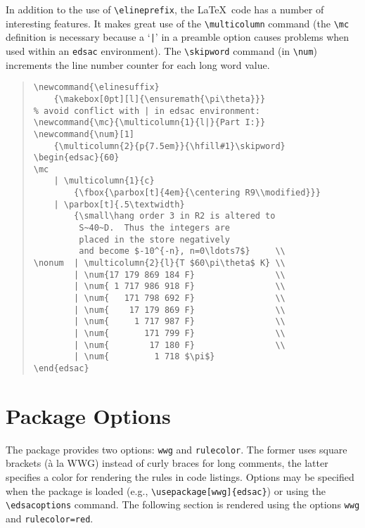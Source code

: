 \documentclass[11pt]{article}
\newcommand{\hang}{\leftskip=1em\parindent=-1em}
\begin{document}
In addition to the use of \verb"\elineprefix", the \LaTeX\ code has
a number of interesting features.  It makes great use of the
\verb"\multicolumn" command (the \verb"\mc" definition is necessary because
a `\verb"|"' in a preamble option causes problems when used within
an \texttt{edsac} environment).  The \verb"\skipword" command (in
\verb"\num")
increments the line number counter for each long word value.
\begin{quote}\small
\begin{verbatim}
\newcommand{\elinesuffix}
    {\makebox[0pt][l]{\ensuremath{\pi\theta}}}
% avoid conflict with | in edsac environment:
\newcommand{\mc}{\multicolumn{1}{l|}{Part I:}}
\newcommand{\num}[1]
    {\multicolumn{2}{p{7.5em}}{\hfill#1}\skipword}
\begin{edsac}{60}
\mc
    | \multicolumn{1}{c}
        {\fbox{\parbox[t]{4em}{\centering R9\\modified}}}
    | \parbox[t]{.5\textwidth}
        {\small\hang order 3 in R2 is altered to
         S~40~D.  Thus the integers are
         placed in the store negatively
         and become $-10^{-n}, n=0\ldots7$}     \\
\nonum  | \multicolumn{2}{l}{T $60\pi\theta$ K} \\
        | \num{17 179 869 184 F}                \\
        | \num{ 1 717 986 918 F}                \\
        | \num{   171 798 692 F}                \\
        | \num{    17 179 869 F}                \\
        | \num{     1 717 987 F}                \\
        | \num{       171 799 F}                \\
        | \num{        17 180 F}                \\
        | \num{         1 718 $\pi$}
\end{edsac}
\end{verbatim}
\end{quote}

\section{Package Options}\label{options}
The package provides two options:  \verb"wwg" and \verb"rulecolor".
The former uses square brackets (\`a la WWG) instead of curly braces
for long comments, the latter specifies a color for rendering the
rules in code listings.  Options may be specified when the package is
loaded (e.g., \verb"\usepackage[wwg]{edsac}") or using the
\verb"\edsacoptions" command.  The following section is rendered
using the options \verb"wwg" and \verb"rulecolor=red".
\end{document}
